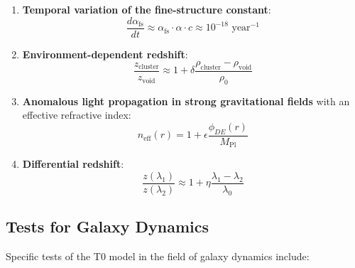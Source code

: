 \documentclass[a4paper,12pt]{article}
\theoremstyle{definition}
\theoremstyle{remark}
\begin{document}
	\begin{enumerate}
		\item \textbf{Temporal variation of the fine-structure constant}:
		\begin{equation}
			\frac{d\alpha_{\text{fs}}}{dt} \approx \alpha_{\text{fs}} \cdot \alpha \cdot c \approx 10^{-18} \text{ year}^{-1}
		\end{equation}
		
		\item \textbf{Environment-dependent redshift}:
		\begin{equation}
			\frac{z_{\text{cluster}}}{z_{\text{void}}} \approx 1 + \delta\frac{\rho_{\text{cluster}} - \rho_{\text{void}}}{\rho_0}
		\end{equation}
		
		\item \textbf{Anomalous light propagation in strong gravitational fields} with an effective refractive index:
		\begin{equation}
			n_{\text{eff}}(r) = 1 + \epsilon \frac{\phi_{DE}(r)}{M_{\text{Pl}}}
		\end{equation}
		
		\item \textbf{Differential redshift}:
		\begin{equation}
			\frac{z(\lambda_1)}{z(\lambda_2)} \approx 1 + \eta\frac{\lambda_1 - \lambda_2}{\lambda_0}
		\end{equation}
	\end{enumerate}
	
	\subsection{Tests for Galaxy Dynamics}
	
	Specific tests of the T0 model in the field of galaxy dynamics include:
	
\end{document}

